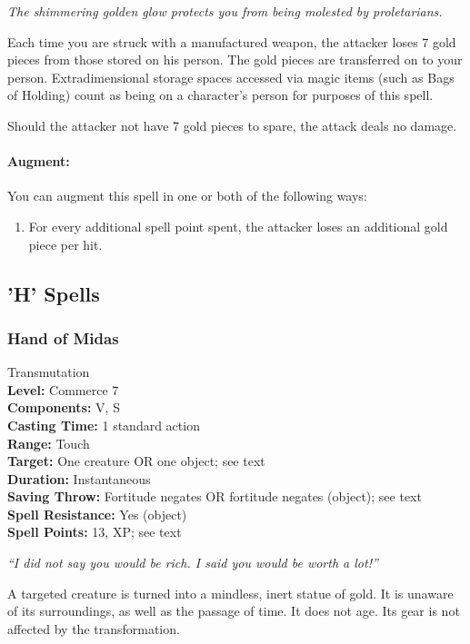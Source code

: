 \emph{The shimmering golden glow protects you from being molested by proletarians.}

Each time you are struck with a manufactured weapon, the attacker loses 7 gold pieces from those stored on his person.
The gold pieces are transferred on to your person. Extradimensional storage spaces accessed via magic items (such as Bags of Holding) count as being on a character's person for purposes of this spell.

Should the attacker not have 7 gold pieces to spare, the attack deals no damage.

\paragraph{Augment:} You can augment this spell in one or both of the following ways:
\begin{enumerate}
 \item For every additional spell point spent, the attacker loses an additional gold piece per hit.
\end{enumerate}

\subsection{'H' Spells}
\subsubsection{Hand of Midas}
\label{Spell:HandOfMidas}
Transmutation
\\ \textbf{Level:} Commerce 7
\\ \textbf{Components:} V, S
\\ \textbf{Casting Time:} 1 standard action
\\ \textbf{Range:} Touch
\\ \textbf{Target:} One creature OR one object; see text
\\ \textbf{Duration:} Instantaneous
\\ \textbf{Saving Throw:} Fortitude negates OR fortitude negates (object); see text
\\ \textbf{Spell Resistance:} Yes (object)
\\ \textbf{Spell Points:} 13, XP; see text

\emph{``I did not say you would be rich. I said you would be worth a lot!''}

A targeted creature is turned into a mindless, inert statue of gold.
It is unaware of its surroundings, as well as the passage of time. It does not age. Its gear is not affected by the transformation.

